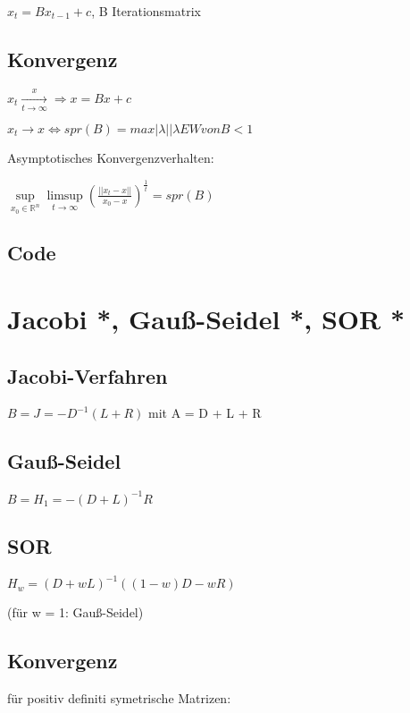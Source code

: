 \documentclass[12pt,a4paper]{article} %
\begin{document}
	$x_t = Bx_{t - 1} + c$, B Iterationsmatrix
	
	\subsection{Konvergenz}
	
	$x_t \xrightarrow[t \rightarrow \infty] x \Rightarrow x = Bx + c$
	
	$x_t \rightarrow x \Leftrightarrow spr(B) = max{|\lambda| | \lambda EW von B} < 1$
	
	Asymptotisches Konvergenzverhalten:
	
	$\sup\limits_{x_0 \in \mathbb{R}^n} \limsup\limits_{t \rightarrow \infty}(\frac{||x_t - x||}{x_0 - x})^{\frac{1}{t}} = spr(B)$
	
	\subsection{Code}
	
	\newpage
	
	\section{Jacobi *, Gauß-Seidel *, SOR *}
	
	\subsection{Jacobi-Verfahren}
	
	$B = J = -D^{-1}(L + R)$ mit A = D + L + R
	
	\subsection{Gauß-Seidel}
	
	$B = H_1 = -(D + L)^{-1}R$
	
	\subsection{SOR}
	
	$H_w = (D + wL)^{-1}((1 - w)D - wR)$
	
	(für w = 1: Gauß-Seidel)
	
	\subsection{Konvergenz}
	
	für positiv definiti symetrische Matrizen:
	
\end{document}
